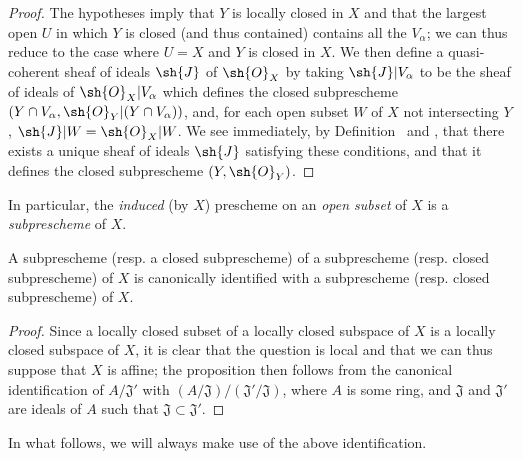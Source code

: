 \begin{proof}
The hypotheses imply that $Y$ is locally closed in $X$ and that the largest open $U$ in which $Y$ is closed (and thus contained) contains all the $V_\alpha$;
we can thus reduce to the case where $U=X$ and $Y$ is closed in $X$.
We then define a quasi-coherent sheaf of ideals $\sh{J}$ of $\sh{O}_X$ by taking $\sh{J}|V_\alpha$ to be the sheaf of ideals of $\sh{O}_X|V_\alpha$ which defines the closed subprescheme $(Y\cap V_\alpha,\sh{O}_Y|(Y\cap V_\alpha))$, and, for each open subset $W$ of $X$ not intersecting $Y$, $\sh{J}|W=\sh{O}_X|W$.
We see immediately, by Definition~ and , that there exists a unique sheaf of ideals $\sh{J}$ satisfying these conditions, and that it defines the closed subprescheme $(Y,\sh{O}_Y)$.
\end{proof}

In particular, the \emph{induced} (by $X$) prescheme on an \emph{open subset} of $X$ is a \emph{subprescheme} of $X$.

\begin{proposition}[4.1.6]
\label{I.4.1.6}
A subprescheme (resp. a closed subprescheme) of a subprescheme
(resp. closed subprescheme) of $X$ is canonically identified with a subprescheme (resp. closed subprescheme) of $X$.
\end{proposition}

\begin{proof}
Since a locally closed subset of a locally closed subspace of $X$ is a locally closed subspace of $X$, it is clear  that the question is local and that we can thus suppose that $X$ is affine;
the proposition then follows from the canonical identification of $A/\mathfrak{J}'$ with $(A/\mathfrak{J})/(\mathfrak{J}'/\mathfrak{J})$, where $A$ is some ring, and $\mathfrak{J}$ and $\mathfrak{J}'$ are ideals of $A$ such that $\mathfrak{J}\subset\mathfrak{J}'$.
\end{proof}

In what follows, we will always make use of the above identification.

